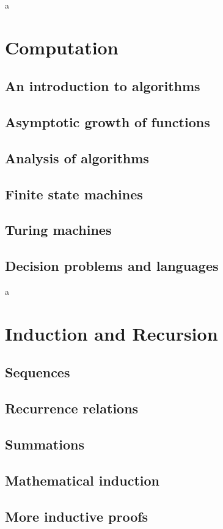 \documentclass{article}
\begin{document}
a

\section{Computation}
\subsection{An introduction to algorithms}
\subsection{Asymptotic growth of functions}
\subsection{Analysis of algorithms}
\subsection{Finite state machines}
\subsection{Turing machines}
\subsection{Decision problems and languages}

a

\section{Induction and Recursion}
\subsection{Sequences}
\subsection{Recurrence relations}
\subsection{Summations}
\subsection{Mathematical induction}
\subsection{More inductive proofs}
\end{document}
